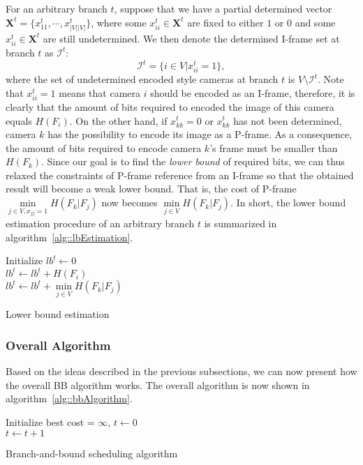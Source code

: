 For an arbitrary branch $t$, suppose that we have a partial determined vector ${\mathbf{X}^t= \{ x_{11}^t,\cdots,x_{|V||V|}^t \} }$, where some ${x_{ii}^t \in \mathbf{X}^t}$ are fixed to either $1$ or $0$ and some ${x_{ii}^t \in \mathbf{X}^t}$ are still undetermined.
We then denote the determined I-frame set at branch $t$ as $\mathcal{I}^t$:
\begin{equation}
\mathcal{I}^t = \{ i \in V | x_{ii}^t = 1 \},
\label{eq::IframeSet}
\end{equation}
where the set of undetermined encoded style cameras at branch $t$ is $V \setminus \mathcal{I}^t$.
Note that ${x_{ii}^t=1}$ means that camera $i$ should be encoded as an I-frame, therefore, it is clearly that the amount of bits required to encoded the image of this camera equals $H(F_i)$.
On the other hand, if ${x_{kk}^t=0}$ or $x_{kk}^t$ has not been determined, camera $k$ has the possibility to encode its image as a P-frame.
As a consequence, the amount of bits required to encode camera $k$'s frame must be smaller than $H(F_k)$.
Since our goal is to find the \emph{lower bound} of required bits, we can thus relaxed the constraints of P-frame reference from an I-frame so that the obtained result will become a weak lower bound.
That is, the cost of P-frame $\underset{j \in V, x_{jj}=1}{\min} H(F_k|F_j)$ now becomes $\underset{j \in V}{\min} H(F_k|F_j)$.
In short, the lower bound estimation procedure of an arbitrary branch $t$  is summarized in algorithm~\ref{alg::lbEstimation}.
%
\IncMargin{1em}
\begin{algorithm}[]
 \SetAlgoLined
 \BlankLine
 Initialize $lb^t \gets 0$\\
 {
 	$lb^t \gets lb^t + H(F_i)$ \\
 }
 {
 	$lb^t \gets lb^t + \underset{j \in V}{\min} H(F_k|F_j)$ \\
 }
 \caption{\label{alg::lbEstimation}Lower bound estimation}
\end{algorithm}
\DecMargin{1em}
%
\subsubsection{Overall Algorithm}
Based on the ideas described in the previous subsections, we can now present how the overall BB algorithm works.
The overall algorithm is now shown in algorithm~\ref{alg::bbAlgorithm}.
\IncMargin{1em}
\begin{algorithm}[]
 \SetAlgoLined
 \BlankLine
 Initialize best cost = $\infty$, $t \gets 0$\\
 \While{}
 {
 	$t \gets t+1$ \\
  	\eIf{}
  	{
 	}
 	{	
 	}
 }
 \caption{\label{alg::bbAlgorithm}Branch-and-bound scheduling algorithm}
\end{algorithm}
\DecMargin{1em}
%
